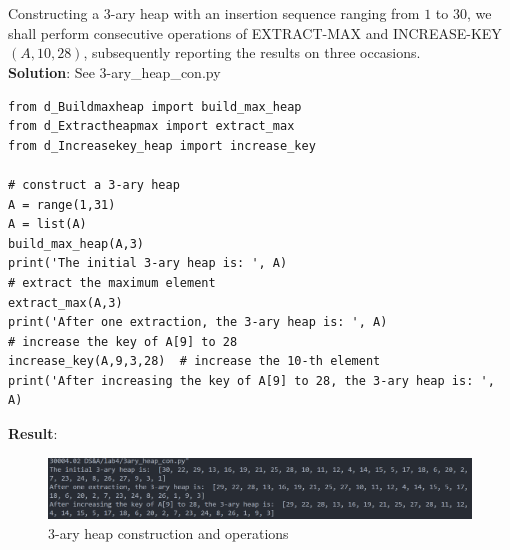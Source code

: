 \documentclass[UTF8]{ctexart}
\begin{document}
\section{}
Constructing a 3-ary heap with an insertion sequence ranging from $1$ to $30$,
we shall perform consecutive operations of EXTRACT-MAX and INCREASE-KEY $(A, 10, 28)$, subsequently reporting the results on three occasions.\\
\textbf{Solution}: See 3-ary\_heap\_con.py
\begin{lstlisting}
from d_Buildmaxheap import build_max_heap
from d_Extractheapmax import extract_max
from d_Increasekey_heap import increase_key

# construct a 3-ary heap
A = range(1,31)
A = list(A)
build_max_heap(A,3)
print('The initial 3-ary heap is: ', A)
# extract the maximum element
extract_max(A,3)
print('After one extraction, the 3-ary heap is: ', A)
# increase the key of A[9] to 28
increase_key(A,9,3,28)  # increase the 10-th element
print('After increasing the key of A[9] to 28, the 3-ary heap is: ', A)   
\end{lstlisting}
\textbf{Result}:
\begin{figure}[H]
   \centering
   \includegraphics[scale=0.8]{3-ary_heap_con.png}
   \caption{3-ary heap construction and operations}
\end{figure}
\end{document}
